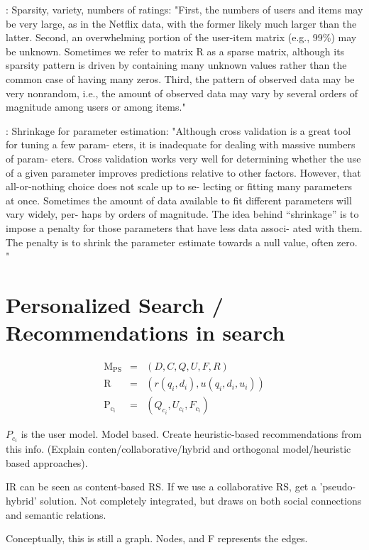 \cite[p2]{Bell2007b}: Sparsity, variety, numbers of ratings:
"First, the numbers of users and items may be very large, as in the Netflix data, with the former likely much larger than the latter.
Second, an overwhelming portion of the user-item matrix (e.g., 99\%) may be unknown. Sometimes we refer to matrix R as a sparse matrix, although its sparsity pattern is driven by containing many unknown values rather than the common case of having many zeros.
Third, the pattern of observed data may be very nonrandom, i.e., the amount of observed data may vary by several orders of magnitude among users or among items."

\cite[p2]{Bell2007b}: Shrinkage for parameter estimation:
"Although cross validation is a great tool for tuning a few param- eters, it is inadequate for dealing with massive numbers of param- eters. Cross validation works very well for determining whether the use of a given parameter improves predictions relative to other factors. However, that all-or-nothing choice does not scale up to se- lecting or fitting many parameters at once. Sometimes the amount of data available to fit different parameters will vary widely, per- haps by orders of magnitude. The idea behind “shrinkage” is to impose a penalty for those parameters that have less data associ- ated with them. The penalty is to shrink the parameter estimate towards a null value, often zero. "

\section{Personalized Search / Recommendations in search}

\begin{eqnarray}
  \mathrm{M_{PS}}  &=& (D, C, Q, U, F, R)\\
  \mathrm{R}       &=& (r(q_i, d_i), u(q_i, d_i, u_i))\\
  \mathrm{P_{c_i}} &=& (Q_{c_i}, U_{c_i}, F_{c_i})
\end{eqnarray}

$P_{c_i}$ is the user model. Model based. Create heuristic-based recommendations from this info.
(Explain conten/collaborative/hybrid and orthogonal model/heuristic based approaches).

IR can be seen as content-based RS. 
If we use a collaborative RS, get a 'pseudo-hybrid' solution. Not completely integrated,
but draws on both social connections and semantic relations.

Conceptually, this is still a graph.
Nodes, and F represents the edges.

